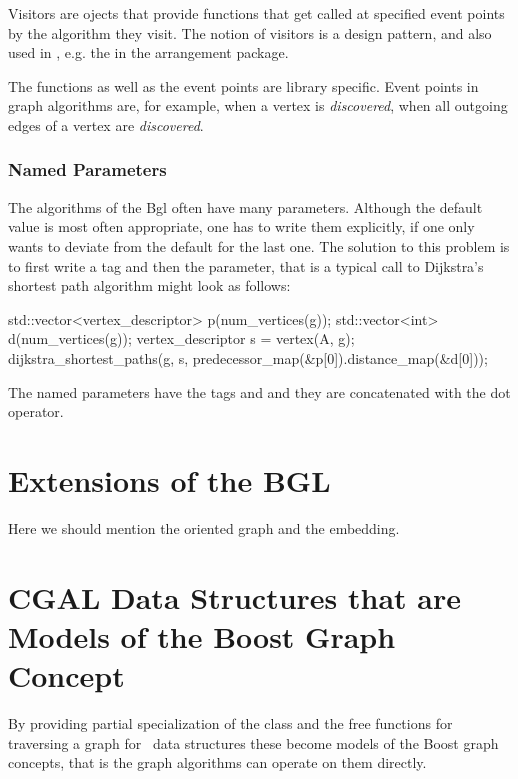 Visitors are ojects that provide functions that get called at
specified event points by the algorithm they visit.  The notion of
visitors is a design pattern, and also used in \cgal, e.g. the  
in the arrangement package.  

The functions as well as the event points are library specific. Event
points in graph algorithms are, for example, when a vertex is {\em discovered}, when
all outgoing edges of a vertex are {\em discovered}.


\subsubsection{Named Parameters}

The algorithms of the {\sc Bgl} often have many parameters. Although the default
value is most often appropriate, one has to write them explicitly, if one only
wants to deviate from the default for the last one.  The solution to this problem
is to first write a tag and then the parameter, that is a typical call to
Dijkstra's shortest path algorithm might look as follows:


\begin{cprog} 
  std::vector<vertex_descriptor> p(num_vertices(g));
  std::vector<int> d(num_vertices(g));
  vertex_descriptor s = vertex(A, g);
  dijkstra_shortest_paths(g, s, predecessor_map(&p[0]).distance_map(&d[0]));
\end{cprog}

The named parameters have the tags  and  and
they are concatenated with the dot operator.


\section{Extensions of the BGL}

Here we should mention the oriented graph and the embedding.


\section{CGAL Data Structures that are Models of the Boost Graph Concept}


By providing partial specialization of the class  and the 
free functions for traversing a graph for \cgal\ data structures these become models of
the Boost graph concepts, that is the graph algorithms can operate on them
directly.

